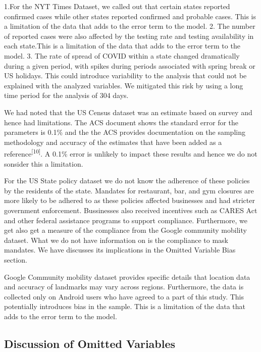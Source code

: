 \documentclass[
]{article}
\begin{document}
1.For the NYT Times Dataset, we called out that certain states reported
confirmed cases while other states reported confirmed and probable
cases. This is a limitation of the data that adds to the error term to
the model. 2. The number of reported cases were also affected by the
testing rate and testing availability in each state.This is a limitation
of the data that adds to the error term to the model. 3. The rate of
spread of COVID within a state changed dramatically during a given
period, with spikes during periods associated with spring break or US
holidays. This could introduce variability to the analysis that could
not be explained with the analyzed variables. We mitigated this risk by
using a long time period for the analysis of 304 days.

We had noted that the US Census dataset was an estimate based on survey
and hence had limitations. The ACS document shows the standard error for
the parameters is 0.1\% and the the ACS provides documentation on the
sampling methodology and accuracy of the estimates that have been added
as a reference\textsuperscript{{[}10{]}}. A 0.1\% error is unlikely to
impact these results and hence we do not sonsider this a limitation.

For the US State policy dataset we do not know the adherence of these
policies by the residents of the state. Mandates for restaurant, bar,
and gym closures are more likely to be adhered to as these policies
affected businesses and had stricter government enforcement. Bussinesses
also received incentives such as CARES Act and other federal assistance
programs to support compliance. Furthermore, we get also get a measure
of the compliance from the Google community mobility dataset. What we do
not have information on is the compliance to mask mandates. We have
discusses its implications in the Omitted Variable Bias section.

Google Community mobility dataset provides specific details that
location data and accuracy of landmarks may vary across regions.
Furthermore, the data is collected only on Android users who have agreed
to a part of this study. This potentially introduces bias in the sample.
This is a limitation of the data that adds to the error term to the
model.

\hypertarget{discussion-of-omitted-variables}{%
\subsection{Discussion of Omitted
Variables}\label{discussion-of-omitted-variables}}
\end{document}

